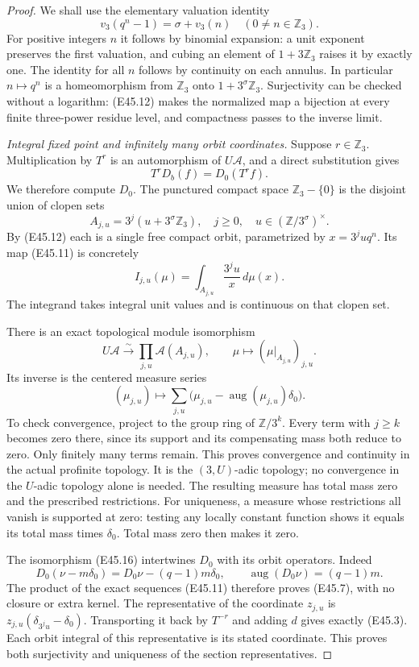 \begin{proof}
We shall use the elementary
valuation identity
\[
 v_3(q^n-1)=\sigma+v_3(n)
                 \quad(0\ne n\in\mathbb Z_3).
 \tag{E45.12}
\]
For positive integers $n$ it
follows by binomial expansion:
a unit exponent preserves the
first valuation, and cubing an
element of $1+3\mathbb Z_3$
raises it by exactly one.
The identity for all $n$ follows
by continuity on each annulus.
In particular $n\mapsto q^n$
is a homeomorphism from
$\mathbb Z_3$ onto
$1+3^\sigma\mathbb Z_3$.
Surjectivity can be checked
without a logarithm: (E45.12)
makes the normalized map a
bijection at every finite
three-power residue level,
and compactness passes to
the inverse limit.

\emph{Integral fixed point and infinitely many orbit coordinates.}
Suppose $r\in\mathbb Z_3$.
Multiplication by $T^r$ is an
automorphism of $U\mathscr A$,
and a direct substitution gives
\[
                T^rD_b(f)=D_0(T^rf).
 \tag{E45.13}
\]
We therefore compute $D_0$.
The punctured compact space
$\mathbb Z_3-\{0\}$ is the
disjoint union of clopen sets
\[
 A_{j,u}=3^j(u+3^\sigma\mathbb Z_3),
 \quad j\ge0,\quad
 u\in(\mathbb Z/3^\sigma)^\times.
 \tag{E45.14}
\]
By (E45.12) each is a single
free compact orbit, parametrized
by $x=3^juq^n$.
Its map (E45.11) is concretely
\[
 I_{j,u}(\mu)=\int_{A_{j,u}}\frac{3^ju}{x}\,d\mu(x).
 \tag{E45.15}
\]
The integrand takes integral
unit values and is continuous
on that clopen set.

There is an exact topological
module isomorphism
\[
 U\mathscr A\xrightarrow{\sim}
       \prod_{j,u}\mathscr A(A_{j,u}),\qquad
 \mu\longmapsto(\mu|_{A_{j,u}})_{j,u}.
 \tag{E45.16}
\]
Its inverse is the centered
measure series
\[
 (\mu_{j,u})\longmapsto
       \sum_{j,u}\bigl(\mu_{j,u}
                  -\operatorname{aug}(\mu_{j,u})\delta_0\bigr).
 \tag{E45.17}
\]
To check convergence, project
to the group ring of
$\mathbb Z/3^k$. Every term
with $j\ge k$ becomes zero
there, since its support and
its compensating mass both
reduce to zero. Only finitely
many terms remain. This
proves convergence and
continuity in the actual
profinite topology. It is
the $(3,U)$-adic topology;
no convergence in the
$U$-adic topology alone is
needed. The resulting measure
has total mass zero and the
prescribed restrictions.
For uniqueness, a measure
whose restrictions all vanish
is supported at zero: testing
any locally constant function
shows it equals its total
mass times $\delta_0$.
Total mass zero then makes
it zero.

The isomorphism (E45.16)
intertwines $D_0$ with its
orbit operators. Indeed
\[
 D_0(\nu-m\delta_0)
       =D_0\nu-(q-1)m\delta_0,
       \qquad\operatorname{aug}(D_0\nu)=(q-1)m.
\]
The product of the exact
sequences (E45.11) therefore
proves (E45.7), with no
closure or extra kernel.
The representative of the
coordinate $z_{j,u}$ is
$z_{j,u}(\delta_{3^ju}-\delta_0)$.
Transporting it back by
$T^{-r}$ and adding $d$
gives exactly (E45.3).
Each orbit integral of this
representative is its stated
coordinate. This proves both
surjectivity and uniqueness
of the section representatives.


\end{proof}
